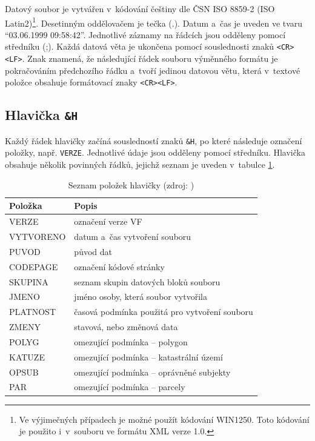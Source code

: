 \documentclass[a4paper,12pt,oneside]{book}
\begin{document}
Datový soubor je vytvářen v~kódování češtiny dle ČSN ISO 8859-2 (ISO
Latin2)\footnote{Ve výjimečných případech je možné použít kódování
  WIN1250. Toto kódování je použito i~v~souboru ve formátu XML verze
  1.0.}. Desetinným oddělovačem je tečka (.). Datum a~čas je uveden ve
tvaru ``03.06.1999 09:58:42''. Jednotlivé záznamy na řádcích jsou
odděleny pomocí středníku (;). Každá datová věta je ukončena pomocí
souslednosti znaků \texttt{<CR><LF>}. Znak \uv{\texttt{\currency}}
znamená, že následující řádek souboru výměnného formátu je
pokračováním předchozího řádku a~tvoří jedinou datovou větu, která
v~textové položce obsahuje formátovací znaky
\texttt{<CR><LF>}. \cite{vfk_struktura}

\subsection{Hlavička \texttt{\&H}}

Každý řádek hlavičky začíná sousledností znaků \texttt{\&H}, po které
následuje označení položky, např. \texttt{VERZE}. Jednotlivé údaje
jsou odděleny pomocí středníku. Hlavička obsahuje několik povinných
řádků, jejichž seznam je uveden v~tabulce \ref{t_hlavicka}.

\begin{table}[htbp]
\centering
\caption[Seznam položek hlavičky]{Seznam položek hlavičky (zdroj: \cite{vfk_struktura})}
\begin{tabular}{ll}
\toprule
\textbf{Položka} & \textbf{Popis} \\ 
\midrule
VERZE & označení verze VF \\ 
VYTVORENO & datum a~čas vytvoření souboru \\ 
PUVOD & původ dat \\ 
CODEPAGE & označení kódové stránky \\ 
SKUPINA & seznam skupin datových bloků souboru \\ 
JMENO & jméno osoby, která soubor vytvořila \\ 
PLATNOST & časová podmínka použitá pro vytvoření souboru \\ 
ZMENY & stavová, nebo změnová data \\ 
POLYG & omezující podmínka -- polygon \\
KATUZE & omezující podmínka -- katastrální území \\
OPSUB & omezující podmínka -- oprávněné subjekty \\
PAR & omezující podmínka -- parcely \\
\bottomrule
\end{tabular}
\label{t_hlavicka}
\end{table}
\end{document}
